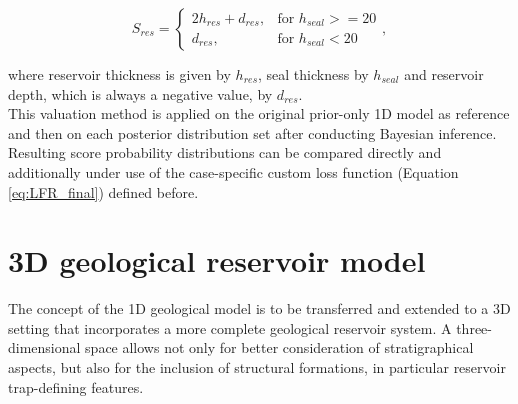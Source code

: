 			\begin{equation}\label{eq:1D_score_system}
			S_{res} = 
			\begin{cases}
			2h_{res} + d_{res}, & \text{for } h_{seal} >= 20  \\
			d_{res}, & \text{for } h_{seal} < 20
			\end{cases},
			\end{equation}
			
			where reservoir thickness is given by $h_{res}$, seal thickness by $h_{seal}$ and reservoir depth, which is always a negative value, by $d_{res}$.\\
			This valuation method is applied on the original prior-only 1D model as reference and then on each posterior distribution set after conducting Bayesian inference. Resulting score probability distributions can be compared directly and additionally under use of the case-specific custom loss function (Equation \ref{eq:LFR_final}) defined before. 
		
		\section{3D geological reservoir model}
		The concept of the 1D geological model is to be transferred and extended to a 3D setting that incorporates a more complete geological reservoir system. A three-dimensional space allows not only for better consideration of stratigraphical aspects, but also for the inclusion of structural formations, in particular reservoir trap-defining features.
		
